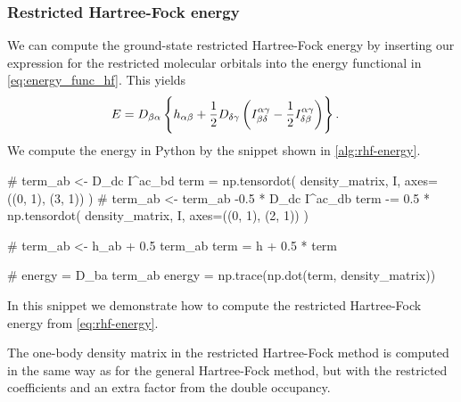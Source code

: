             \subsubsection{Restricted Hartree-Fock energy}
                We can compute the ground-state restricted Hartree-Fock energy
                by inserting our expression for the restricted molecular
                orbitals into the energy functional in
                \autoref{eq:energy_func_hf}.
                This yields
                \begin{align}
                    E
                    &=
                    D_{\beta\alpha}
                    \left\{ 
                        h_{\alpha\beta}
                        + \frac{1}{2} D_{\delta\gamma}
                        \left( 
                            I^{\alpha\gamma}_{\beta\delta}
                            - \frac{1}{2}
                            I^{\alpha\gamma}_{\delta\beta}
                         \right)
                     \right\}.
                    \label{eq:rhf-energy}
                \end{align}
                We compute the energy in Python by the snippet shown in
                \autoref{alg:rhf-energy}.
                \begin{algorithm}
                    \begin{python}
# term_{ab} <- D_{dc} I^{ac}_{bd}
term = np.tensordot(
    density_matrix, I, axes=((0, 1), (3, 1))
)
# term_{ab} <- term_{ab} -0.5 * D_{dc} I^{ac}_{db}
term -= 0.5 * np.tensordot(
    density_matrix, I, axes=((0, 1), (2, 1))
)

# term_{ab} <- h_{ab} + 0.5 term_{ab}
term = h + 0.5 * term

# energy = D_{ba} term_{ab}
energy = np.trace(np.dot(term, density_matrix))
                    \end{python}
                    \caption{In this snippet we demonstrate how to compute the
                    restricted Hartree-Fock energy from
                    \autoref{eq:rhf-energy}.}
                    \label{alg:rhf-energy}
                \end{algorithm}
                The one-body density matrix in the restricted Hartree-Fock
                method is computed in the same way as for the general
                Hartree-Fock method, but with the restricted coefficients and an
                extra factor from the double occupancy.

